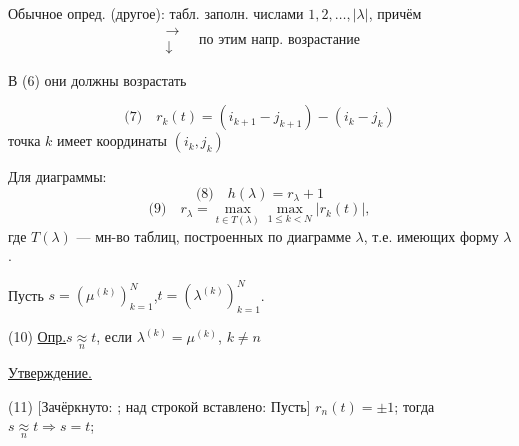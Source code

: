 Обычное опред. (другое): табл. заполн. числами $1,2,\ldots,|\lambda|$, причём
\begin{equation*}
\begin{matrix}\rightarrow\\\downarrow\end{matrix}
\quad\text{по этим напр. возрастание}
\end{equation*}



В (6) они должны возрастать

\begin{center}
\end{center}

\begin{equation*}
\text{(7)}\quad r_k(t)=(i_{k+1}-j_{k+1})-(i_k-j_k)
\end{equation*}
точка $k$ имеет координаты $(i_k,j_k)$

Для диаграммы:
\begin{equation*}
\text{(8)}\quad h(\lambda)=r_\lambda+1
\end{equation*}
\begin{equation*}
\text{(9)}\quad r_\lambda=\max_{t\in T(\lambda)}\max_{1\leq k<N}|r_k(t)|,
\end{equation*}
где $T(\lambda)$ --- мн-во таблиц, построенных по диаграмме $\lambda$, т.е.
имеющих форму $\lambda$.

Пусть $s=(\mu^{(k)})_{k=1}^{N}$,\quad $t=(\lambda^{(k)})_{k=1}^{N}$.

(10) \underline{Опр.}\quad $s\underset{n}{\approx}t$, если $\lambda^{(k)}=\mu^{(k)}$, $k\ne n$

\underline{Утверждение.}

(11) [Зачёркнуто: ;
над строкой вставлено: Пусть]
$r_n(t)=\pm1$; тогда $s\underset{n}{\approx}t\Rightarrow s=t$;

